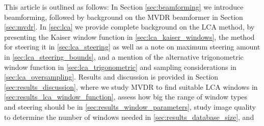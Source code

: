 \documentclass[10pt,journal,draftclsnofoot,onecolumn]{IEEEtran}
\newcommand\1{\vec 1}
\begin{document}
This article is outlined as follows: In Section \ref{sec:beamforming} we introduce beamforming, followed by background on the MVDR beamformer in Section \ref{sec:mvdr}. In \ref{sec:lca} we provide complete background on the LCA method, by presenting the Kaiser window function in \ref{sec:lca_kaiser_windows}, the method for steering it in \ref{sec:lca_steering} as well as a note on maximum steering amount in \ref{sec:lca_steering_bounds}, and a mention of the alternative trigonometric window function in \ref{sec:lca_trigonometric} and sampling considerations in \ref{sec:lca_oversampling}. Results and discussion is provided in Section \ref{sec:results_discussion}, where we study MVDR to find suitable LCA windows in \ref{sec:results_lca_window_function}, assess how big the range of window types and steering should be in \ref{sec:results_window_parameters}, study image quality to determine the number of windows needed in \ref{sec:results_database_size}, and 


% 
% 
% 
% 
% 
% 
\end{document}
